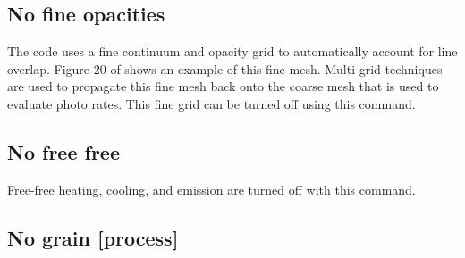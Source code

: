 \subsection{No fine opacities}

The code uses a fine continuum and opacity grid to automatically account
for line overlap.
Figure 20 of \citet{Shaw2005} shows an example of this
fine mesh.
Multi-grid techniques are used to propagate this fine mesh back
onto the coarse mesh that is used to evaluate photo rates.
This fine grid
can be turned off using this command.

\subsection{No free free}

Free-free heating, cooling, and emission are turned off with this command.

\subsection{No grain [process]}

